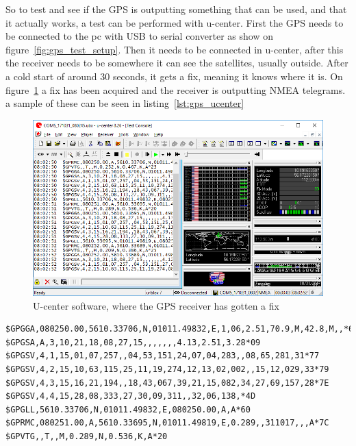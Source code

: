 So to test and see if the GPS is outputting something that can be used, and that it actually works, a test can be performed with u-center. First the GPS needs to be connected to the pc with USB to serial converter as show on figure~\ref{fig:gps_test_setup}. Then it needs to be connected in u-center, after this the receiver needs to be somewhere it can see the satellites, usually outside. After a cold start of around 30 seconds, it gets a fix, meaning it knows where it is. On figure~\ref{fig:gps_ucenter} a fix has been acquired and the receiver is outputting NMEA telegrams. a sample of these can be seen in listing~\ref{lst:gps_ucenter}

\begin{figure}[H]
\centering
\includegraphics[width=1\linewidth]{Images/Implementation/ucenter_gps_test}
\caption{U-center software, where the GPS receiver has gotten a fix}
\label{fig:gps_ucenter}
\end{figure}

\begin{lstlisting}[caption = {Sample output of NMEA telegram when gps has fix in u-center, with time removed}, captionpos=b, label={lst:gps_ucenter},firstnumber=1]
$GPGGA,080250.00,5610.33706,N,01011.49832,E,1,06,2.51,70.9,M,42.8,M,,*65
$GPGSA,A,3,10,21,18,08,27,15,,,,,,,4.13,2.51,3.28*09
$GPGSV,4,1,15,01,07,257,,04,53,151,24,07,04,283,,08,65,281,31*77
$GPGSV,4,2,15,10,63,115,25,11,19,274,12,13,02,002,,15,12,029,33*79
$GPGSV,4,3,15,16,21,194,,18,43,067,39,21,15,082,34,27,69,157,28*7E
$GPGSV,4,4,15,28,08,333,27,30,09,311,,32,06,138,*4D
$GPGLL,5610.33706,N,01011.49832,E,080250.00,A,A*60
$GPRMC,080251.00,A,5610.33695,N,01011.49819,E,0.289,,311017,,,A*7C
$GPVTG,,T,,M,0.289,N,0.536,K,A*20
\end{lstlisting}

